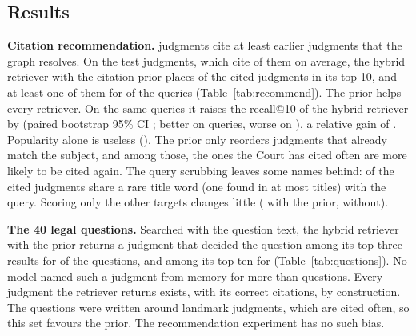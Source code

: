 \subsection{Results}
\label{sec:retres}
\textbf{Citation recommendation.} \RecPool{} judgments cite at least \RecMinTargets{} earlier judgments that the graph resolves. On the \RecNTest{} test judgments, which cite \RecMeanTargets{} of them on average, the hybrid retriever with the citation prior places \RecHybridPriorRTenPct{} of the cited judgments in its top 10, and at least one of them for \RecHybridPriorHitTen{} of the queries (Table~\ref{tab:recommend}). The prior helps every retriever. On the same queries it raises the recall@10 of the hybrid retriever by \RecDiffPrior{} (paired bootstrap 95\% CI \RecDiffPriorCI; better on \RecDiffPriorBetter{} queries, worse on \RecDiffPriorWorse), a relative gain of \RecPriorRelGain. Popularity alone is useless (\RecPopRTen). The prior only reorders judgments that already match the subject, and among those, the ones the Court has cited often are more likely to be cited again. The query scrubbing leaves some names behind: \RecLeakStrictPct{} of the cited judgments share a rare title word (one found in at most \RecLeakRareDF{} titles) with the query. Scoring only the other targets changes little (\RecHybridPriorRTenUnleaked{} with the prior, \RecHybridRTenUnleaked{} without).

\begin{table}[t]
\caption{Citation recommendation on \RecNTest{} held-out judgments: given the headnote without citations and case names, retrieve the earlier judgments it cites. R@$k$ = share of cited judgments in the top $k$; Hit@10 = share of queries with at least one in the top 10; MRR = mean reciprocal rank of the first. Weights chosen on \RecNDev{} other judgments.}
\label{tab:recommend}
\centering
\footnotesize
\setlength{\tabcolsep}{4pt}

\end{table}

\textbf{The 40 legal questions.} Searched with the question text, the hybrid retriever with the prior returns a judgment that decided the question among its top three results for \QHybridPriorHitThree{} of the \NumTopics{} questions, and among its top ten for \QHybridPriorHitTen{} (Table~\ref{tab:questions}). No model named such a judgment from memory for more than \RefClosedLlama{} questions. Every judgment the retriever returns exists, with its correct citations, by construction. The questions were written around landmark judgments, which are cited often, so this set favours the prior. The recommendation experiment has no such bias.

\begin{table}[t]
\caption{Retrieval for the \NumTopics{} T4 questions: questions whose top-$k$ results contain a reference judgment, and the share of reference judgments in the top 10 (R@10). Weights from the recommendation development split.}
\label{tab:questions}
\centering
\footnotesize
\setlength{\tabcolsep}{4pt}

\end{table}
